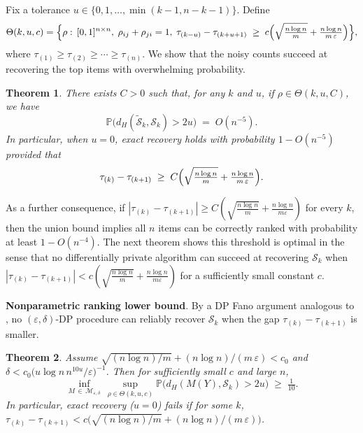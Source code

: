\documentclass[letterpaper,12pt]{article}
\numberwithin{equation}{section}
\theoremstyle{plain}
\newtheorem{Theorem}{Theorem}
\numberwithin{Theorem}{section}
\numberwithin{corollary}{section}
\numberwithin{proposition}{section}
\numberwithin{Lemma}{section}
{
	\theoremstyle{definition}
	\newtheorem{Definition}{Definition}
	\newtheorem{example}{Example}
	\numberwithin{example}{section}
	\newtheorem{fact}{Fact}
	\numberwithin{fact}{section}
	\newtheorem{remark}{Remark}
}
\newcommand{\1}{\mathbbm{1}}
\def\Pr{\mathbb P}
\begin{document}
 Fix a tolerance \(u\in\{0,1,\dots,\min(k-1,n-k-1)\}\).  Define
\[
\Theta(k,u,c)
=\Bigl\{
\rho:\,[0,1]^{n\times n},\;\rho_{ij}+\rho_{ji}=1,\;
\tau_{(k-u)}-\tau_{(k+u+1)}
\;\ge\;c\Bigl(\sqrt{\tfrac{n\log n}{m}}+\tfrac{n\log n}{m\,\varepsilon}\Bigr)
\Bigr\},
\]
where \(\tau_{(1)}\ge\tau_{(2)}\ge\cdots\ge\tau_{(n)}\).  We show that the noisy counts succeed at recovering the top items with overwhelming probability.

\begin{Theorem}
	\label{thm: individual ranking nonparametric upper bound}
	There exists \(C>0\) such that, for any \(k\) and \(u\), if \(\rho\in\Theta(k,u,C)\), we have
	\[
	\Pr\bigl(d_H(\widetilde{\mathcal{S}}_k,\mathcal{S}_k)>2u\bigr)
	\;=\;O(n^{-5}).
	\]
	In particular, when \(u=0\), exact recovery holds with probability \(1-O(n^{-5})\) provided that
	\[
	\tau_{(k)}-\tau_{(k+1)}
	\;\ge\;
	C\Bigl(\sqrt{\tfrac{n\log n}{m}}+\tfrac{n\log n}{m\,\varepsilon}\Bigr).
	\]
\end{Theorem}

As a further consequence, if $|\tau_{(k)} - \tau_{(k+1)}| 
\geq C\left(\sqrt{\frac{n\log n}{m}} + \frac{n\log n}{m\varepsilon}\right)$ for every $k$, then the union bound implies all $n$ items can be correctly ranked with probability at least $1 - O(n^{-4})$. The next theorem shows this threshold is optimal in the sense that no differentially private algorithm can succeed at recovering $\mathcal S_k$ when $|\tau_{(k)} - \tau_{(k+1)}| 
< c\left(\sqrt{\frac{n\log n}{m}} + \frac{n\log n}{m\varepsilon}\right)$ for a sufficiently small constant $c$.

\medskip
\noindent
\textbf{Nonparametric ranking lower bound}.  By a DP Fano argument analogous to \cite{barber2014privacy,acharya2021differentially}, no \((\varepsilon,\delta)\)-DP procedure can reliably recover \(\mathcal{S}_k\) when the gap \(\tau_{(k)}-\tau_{(k+1)}\) is smaller.

\begin{Theorem} \label{thm: individual nonparametric ranking lower bound}
	Assume \(\sqrt{(n\log n)/m}+(n\log n)/(m\,\varepsilon)<c_0\) and 
	\(\delta< c_0\bigl(u\log n\,n^{10u}/\varepsilon\bigr)^{-1}\).  Then for sufficiently small \(c\) and large \(n\),
	\[
	\inf_{M\,\in\,\mathcal{M}_{\varepsilon,\delta}}\,
	\sup_{\rho\in\Theta(k,u,c)}
	\Pr\bigl(d_H(M(Y),\mathcal{S}_k)>2u\bigr)
	\;\ge\;\tfrac{1}{10}.
	\]
	In particular, exact recovery (\(u=0\)) fails if for some $k$, 
	\(\tau_{(k)}-\tau_{(k+1)}<c\bigl(\sqrt{(n\log n)/m}+(n\log n)/(m\,\varepsilon)\bigr)\).
\end{Theorem}
\end{document}
